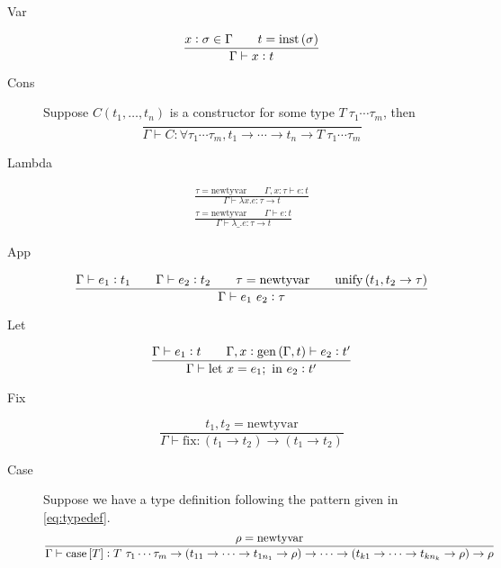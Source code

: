 \documentclass[12pt]{article}
\newcommand{\newtyvar}{\mathrm{newtyvar}}
\newcommand{\inst}[1]{\mathrm{inst}\del{#1}}
\newcommand{\gen}[2]{\mathrm{gen}\del{#1, #2}}
\newcommand{\unify}[2]{\mathrm{unify}\del{#1, #2}}
\begin{document}
\begin{description}
\item[Var]
  \begin{equation}
    \frac{x : \sigma \in \Gamma \qquad t = \inst{\sigma}}{\Gamma \vdash x : t}
  \end{equation}

\item[Cons] Suppose $C(t_1,\ldots,t_n)$ is a constructor for some type
  $T~\tau_1\cdots\tau_m$, then
  \begin{equation}
    \frac{}{\Gamma \vdash C : \forall \tau_1\cdots\tau_m, t_1 \to \cdots \to t_n \to T~\tau_1\cdots\tau_m}
  \end{equation}

\item[Lambda]
  \begin{gather}
    \frac{\tau = \newtyvar \qquad \Gamma, x : \tau \vdash e : t}{\Gamma \vdash \lambda x. e : \tau \to t}\\
    \frac{\tau = \newtyvar \qquad \Gamma \vdash e : t}{\Gamma \vdash \lambda \_. e : \tau \to t}
  \end{gather}

\item[App]
  \begin{equation}
    \frac{\Gamma \vdash e_1 : t_1 \qquad \Gamma \vdash e_2 : t_2 \qquad \tau = \newtyvar \qquad \unify{t_1}{t_2 \to \tau}}{\Gamma \vdash e_1~e_2 : \tau}
  \end{equation}

\item[Let]
  \begin{equation}
    \frac{\Gamma \vdash e_1 : t \qquad \Gamma, x : \gen{\Gamma}{t} \vdash e_2 : t'}{\Gamma \vdash \mathrm{let}~x = e_1;~\mathrm{in}~e_2 : t'}
  \end{equation}

\item[Fix]
  \begin{equation}
    \frac{t_1, t_2 = \newtyvar}{\Gamma \vdash \mathrm{fix} : (t_1 \to t_2) \to (t_1 \to t_2)}
  \end{equation}

\item[Case] Suppose we have a type definition following the pattern
  given in \eqref{eq:typedef}.
  \begin{equation}
    \frac{\rho = \newtyvar}{\Gamma \vdash \mathrm{case}\sbr{T} : T~\tau_1\cdots\tau_m \to (t_{11} \to \cdots \to t_{1n_1} \to \rho) \to \cdots \to (t_{k1} \to \cdots \to t_{kn_k} \to \rho) \to \rho}
  \end{equation}
\end{description}
\end{document}
